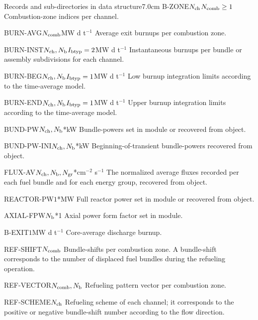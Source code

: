 \begin{DescriptionEnregistrement}{Records and sub-directories
 in  data structure}{7.0cm}
\OptIntEnr
 {B-ZONE}{$N_{\rm ch}$}{$N_{\rm comb}\geq1$}
 {Combustion-zone indices per channel.}

\RealEnr
 {BURN-AVG}{$N_{\rm comb}$}{MW d t$^{-1}$}
 {Average exit burnups per combustion zone.}

\OptRealEnr
 {BURN-INST}{$N_{\rm ch}, N_{\rm b}$}{$I_{\rm btyp}=2$}{MW d t$^{-1}$}
 {Instantaneous burnups per bundle or assembly subdivisions for each channel.}

\OptRealEnr
 {BURN-BEG}{$N_{\rm ch}, N_{\rm b}$}{$I_{\rm btyp}=1$}{MW d t$^{-1}$}
 {Low burnup integration limits according to the time-average model.}

\OptRealEnr
 {BURN-END}{$N_{\rm ch}, N_{\rm b}$}{$I_{\rm btyp}=1$}{MW d t$^{-1}$}
 {Upper burnup integration limits according to the time-average model.}

\OptRealEnr
 {BUND-PW}{$N_{\rm ch}, N_{\rm b}$}{*}{kW}
 {Bundle-powers set in  module or recovered from  object.}

\OptRealEnr
 {BUND-PW-INI}{$N_{\rm ch}, N_{\rm b}$}{*}{kW}
 {Beginning-of-transient bundle-powers recovered from  object.}

\OptRealEnr
 {FLUX-AV}{$N_{\rm ch}, N_{\rm b}, N_{\rm gr}$}{*}{cm$^{-2}$ s$^{-1}$}
 {The normalized average fluxes recorded per each fuel bundle and for
  each energy group, recovered from  object.}

\OptRealEnr
 {REACTOR-PW}{$1$}{*}{MW}
 {Full reactor power set in  module or recovered from  object.}

\OptRealEnr
 {AXIAL-FPW}{$N_{\rm b}$}{*}{1}
 {Axial power form factor set in  module.}

\RealEnr
 {B-EXIT}{$1$}{MW d t$^{-1}$}
 {Core-average discharge burnup.}

\IntEnr
 {REF-SHIFT}{$N_{\rm comb}$}
 {Bundle-shifts per combustion zone. A bundle-shift corresponds to the 
  number of displaced fuel bundles during the refueling operation.}

\IntEnr
 {REF-VECTOR}{$N_{\rm comb}, N_{\rm b}$}
 {Refueling pattern vector per combustion zone.}

\IntEnr
 {REF-SCHEME}{$N_{\rm ch}$}
 {Refueling scheme of each channel; it corresponds to the positive
  or negative bundle-shift number according to the flow direction. }


\end{DescriptionEnregistrement}
